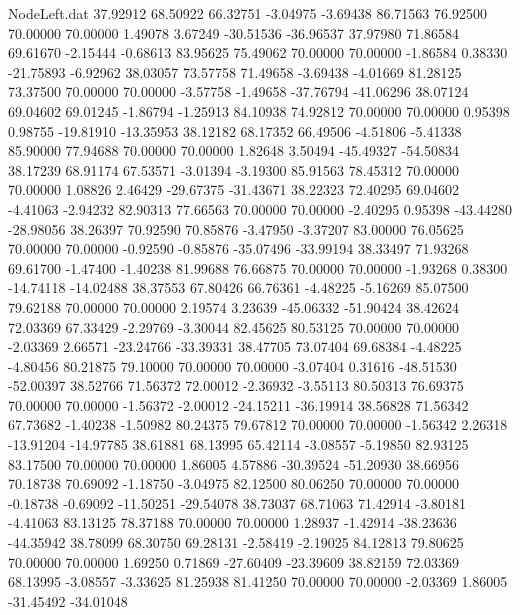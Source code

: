 \begin{filecontents}{NodeLeft.dat}
  37.92912   68.50922   66.32751    -3.04975   -3.69438   86.71563   76.92500   70.00000   70.00000    1.49078    3.67249  -30.51536  -36.96537
  37.97980   71.86584   69.61670    -2.15444   -0.68613   83.95625   75.49062   70.00000   70.00000   -1.86584    0.38330  -21.75893   -6.92962
  38.03057   73.57758   71.49658    -3.69438   -4.01669   81.28125   73.37500   70.00000   70.00000   -3.57758   -1.49658  -37.76794  -41.06296
  38.07124   69.04602   69.01245    -1.86794   -1.25913   84.10938   74.92812   70.00000   70.00000    0.95398    0.98755  -19.81910  -13.35953
  38.12182   68.17352   66.49506    -4.51806   -5.41338   85.90000   77.94688   70.00000   70.00000    1.82648    3.50494  -45.49327  -54.50834
  38.17239   68.91174   67.53571    -3.01394   -3.19300   85.91563   78.45312   70.00000   70.00000    1.08826    2.46429  -29.67375  -31.43671
  38.22323   72.40295   69.04602    -4.41063   -2.94232   82.90313   77.66563   70.00000   70.00000   -2.40295    0.95398  -43.44280  -28.98056
  38.26397   70.92590   70.85876    -3.47950   -3.37207   83.00000   76.05625   70.00000   70.00000   -0.92590   -0.85876  -35.07496  -33.99194
  38.33497   71.93268   69.61700    -1.47400   -1.40238   81.99688   76.66875   70.00000   70.00000   -1.93268    0.38300  -14.74118  -14.02488
  38.37553   67.80426   66.76361    -4.48225   -5.16269   85.07500   79.62188   70.00000   70.00000    2.19574    3.23639  -45.06332  -51.90424
  38.42624   72.03369   67.33429    -2.29769   -3.30044   82.45625   80.53125   70.00000   70.00000   -2.03369    2.66571  -23.24766  -33.39331
  38.47705   73.07404   69.68384    -4.48225   -4.80456   80.21875   79.10000   70.00000   70.00000   -3.07404    0.31616  -48.51530  -52.00397
  38.52766   71.56372   72.00012    -2.36932   -3.55113   80.50313   76.69375   70.00000   70.00000   -1.56372   -2.00012  -24.15211  -36.19914
  38.56828   71.56342   67.73682    -1.40238   -1.50982   80.24375   79.67812   70.00000   70.00000   -1.56342    2.26318  -13.91204  -14.97785
  38.61881   68.13995   65.42114    -3.08557   -5.19850   82.93125   83.17500   70.00000   70.00000    1.86005    4.57886  -30.39524  -51.20930
  38.66956   70.18738   70.69092    -1.18750   -3.04975   82.12500   80.06250   70.00000   70.00000   -0.18738   -0.69092  -11.50251  -29.54078
  38.73037   68.71063   71.42914    -3.80181   -4.41063   83.13125   78.37188   70.00000   70.00000    1.28937   -1.42914  -38.23636  -44.35942
  38.78099   68.30750   69.28131    -2.58419   -2.19025   84.12813   79.80625   70.00000   70.00000    1.69250    0.71869  -27.60409  -23.39609
  38.82159   72.03369   68.13995    -3.08557   -3.33625   81.25938   81.41250   70.00000   70.00000   -2.03369    1.86005  -31.45492  -34.01048

\end{filecontents}
